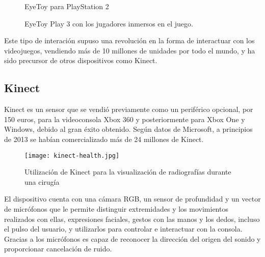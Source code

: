 \begin{figure}[b] %
\hfill
\begin{minipage}[t]{.45\textwidth}
\begin{center}
\caption{EyeToy para PlayStation 2}
\label{eyeToy}
\end{center}
\end{minipage}
\hfill
\begin{minipage}[t]{.45\textwidth}
\begin{center}
\caption{EyeToy Play 3 con los jugadores inmersos en el juego.}
\label{eyetoy-game}
\end{center}
\end{minipage}
\hfill
\end{figure}

Este tipo de interación supuso una revolución en la forma de interactuar con los videojuegos, vendiendo más de 10 millones de unidades por todo el mundo, y ha sido precursor de otros dispositivos como Kinect.

\subsection{Kinect}
Kinect es un sensor que se vendió previamente como un periférico opcional, por 150 euros, para la videoconsola Xbox 360 y posteriormente para Xbox One y Windows, debido al gran éxito obtenido. Según datos de Microsoft, a principios de 2013 se habían comercializado más de 24 millones de Kinect. 

\begin{figure}
  \centering
  \texttt{[image: kinect-health.jpg]}
  \caption{Utilización de Kinect para la visualización de radiografías durante una cirugía}
  \label{fig:kinect-health}
\end{figure}



El dispositivo cuenta con una cámara RGB, un sensor de profundidad y un vector de micrófonos que le permite distinguir extremidades y los movimientos realizados con ellas, expresiones faciales, gestos con las manos y los dedos, incluso el pulso del usuario, y utilizarlos para controlar e interactuar con la consola. Gracias a los micrófonos es capaz de reconocer la dirección del origen del sonido y proporcionar cancelación de ruido.

